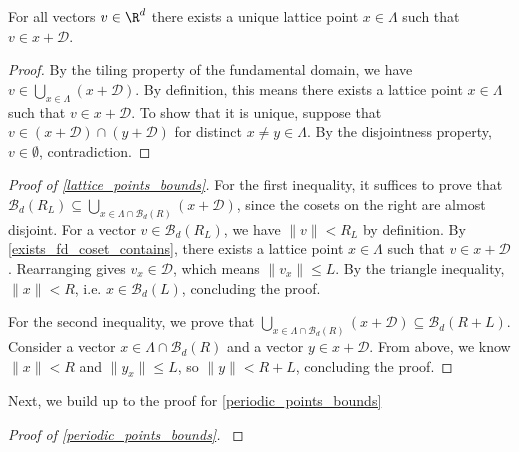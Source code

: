 \begin{lemma}\label{exists_fd_coset_contains}\lean{}
  For all vectors $v \in \R^d$ there exists a unique lattice point $x \in \Lambda$ such that $v \in x + \mathcal{D}$.
\end{lemma}
\begin{proof}
  By the tiling property of the fundamental domain, we have $v \in \bigcup_{x \in \Lambda} (x + \mathcal{D})$. By definition, this means there exists a lattice point $x \in \Lambda$ such that $v \in x + \mathcal{D}$. To show that it is unique, suppose that $v \in (x + \mathcal{D}) \cap (y + \mathcal{D})$ for distinct $x \neq y \in \Lambda$. By the disjointness property, $v \in \emptyset$, contradiction.
\end{proof}

\begin{proof}[Proof of \cref{lattice_points_bounds}]\label{lattice_points_bounds_proof}
  For the first inequality, it suffices to prove that $\mathcal{B}_d(R _ L) \subseteq \bigcup_{x \in \Lambda \cap \mathcal{B}_d(R)} (x + \mathcal{D})$, since the cosets on the right are almost disjoint. For a vector $v \in \mathcal{B}_d(R _ L)$, we have $\|v\| < R _ L$ by definition. By \cref{exists_fd_coset_contains}, there exists a lattice point $x \in \Lambda$ such that $v \in x + \mathcal{D}$. Rearranging gives $v _ x \in \mathcal{D}$, which means $\|v _ x\| \leq L$. By the triangle inequality, $\|x\| < R$, i.e. $x \in \mathcal{B}_d(L)$, concluding the proof.

  For the second inequality, we prove that $\bigcup_{x \in \Lambda \cap \mathcal{B}_d(R)} (x + \mathcal{D}) \subseteq \mathcal{B}_d(R + L)$. Consider a vector $x \in \Lambda \cap \mathcal{B}_d(R)$ and a vector $y \in x + \mathcal{D}$. From above, we know $\|x\| < R$ and $\|y _ x\| \leq L$, so $\|y\| < R + L$, concluding the proof.
\end{proof}

Next, we build up to the proof for \cref{periodic_points_bounds}

\begin{definition}\label{periodic_quot_lattice_def}
\end{definition}

\begin{proof}[Proof of \cref{periodic_points_bounds}]\label{periodic_points_bounds_proof}\leanok
\end{proof}
